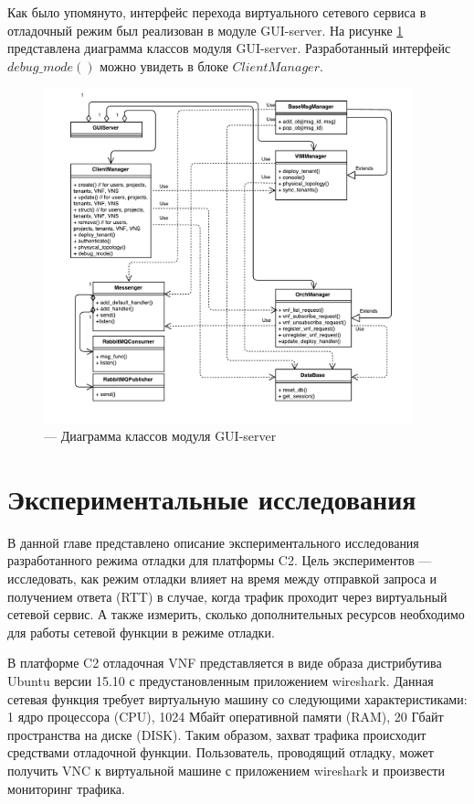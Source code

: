\documentclass[oneside,final,14pt,a4paper]{extreport}
\begin{document}
Как было упомянуто, интерфейс перехода виртуального сетевого сервиса в отладочный режим был реализован в модуле GUI-server. На рисунке \ref{pic:guis_classes_diagram} представлена диаграмма классов модуля GUI-server. Разработанный интерфейс $debug\_mode()$ можно увидеть в блоке $ClientManager$.
\begin{figure}[h]
	\centering
	\includegraphics[width=0.95\textwidth]{gui_classes_diagram}
	\caption{--- Диаграмма классов модуля GUI-server}
	\label{pic:guis_classes_diagram}
\end{figure}





\chapter{Экспериментальные исследования}
\label{chap:expirements}
В данной главе представлено описание экспериментального исследования разработанного режима отладки для платформы C2. Цель экспериментов --- исследовать, как режим отладки влияет на время между отправкой запроса и получением ответа (RTT) в случае, когда трафик проходит через виртуальный сетевой сервис. А также измерить, сколько дополнительных ресурсов необходимо для работы сетевой функции в режиме отладки.

В платформе C2 отладочная VNF представляется в виде образа дистрибутива Ubuntu версии 15.10 с предустановленным приложением wireshark\cite{bib:wireshark}. Данная сетевая функция требует виртуальную машину со следующими характеристиками: 1 ядро процессора (CPU), 1024 Мбайт оперативной памяти (RAM), 20 Гбайт пространства на диске (DISK). Таким образом, захват трафика происходит средствами отладочной функции. Пользователь, проводящий отладку, может получить VNC к виртуальной машине с приложением wireshark и произвести мониторинг трафика. 
\end{document}

